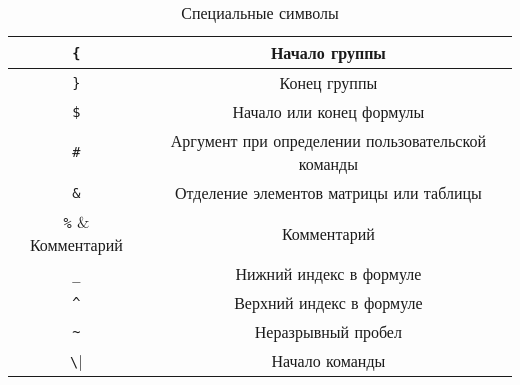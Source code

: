 \begin{table}
	\begin{tabular}{|c|c|}
		\hline \Verb|{| & Начало группы \\
		\hline \Verb|}| & Конец группы \\
		\hline \Verb|$| & Начало или конец формулы \\
		\hline \Verb|#| & Аргумент при определении пользовательской команды \\
		\hline \Verb|&| & Отделение элементов матрицы или таблицы \\
		\hline \Verb|%
		\hline \Verb|_| & Нижний индекс в формуле \\
		\hline \Verb|^| & Верхний индекс в формуле \\
		\hline \Verb|~| & Неразрывный пробел \\
		\hline \Verb|\| & Начало команды \\
		\hline
	\end{tabular}
	\caption{Специальные символы}
\end{table}